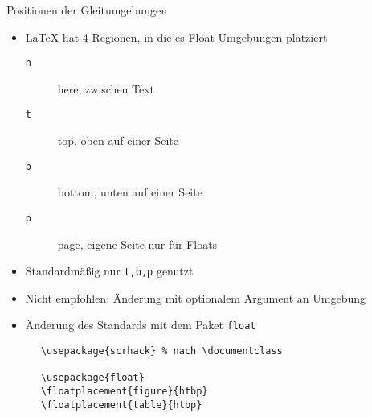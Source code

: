 \begin{frame}[fragile]{Positionen der Gleitumgebungen}
  \begin{itemize}
    \item \LaTeX{} hat 4 Regionen, in die es Float-Umgebungen platziert
      \begin{description}
        \item[\texttt{h}] here, zwischen Text
        \item[\texttt{t}] top, oben auf einer Seite
        \item[\texttt{b}] bottom, unten auf einer Seite
        \item[\texttt{p}] page, eigene Seite nur für Floats
      \end{description}
    \item Standardmäßig nur \texttt{t,b,p} genutzt
    \item \alert{Nicht} empfohlen: Änderung mit optionalem Argument an Umgebung
    \item Änderung des Standards mit dem Paket \texttt{float}
  \end{itemize}

  \begin{Packages}
    \begin{lstlisting}
      \usepackage{scrhack} % nach \documentclass

      \usepackage{float}
      \floatplacement{figure}{htbp}
      \floatplacement{table}{htbp}
    \end{lstlisting}
  \end{Packages}
\end{frame}
